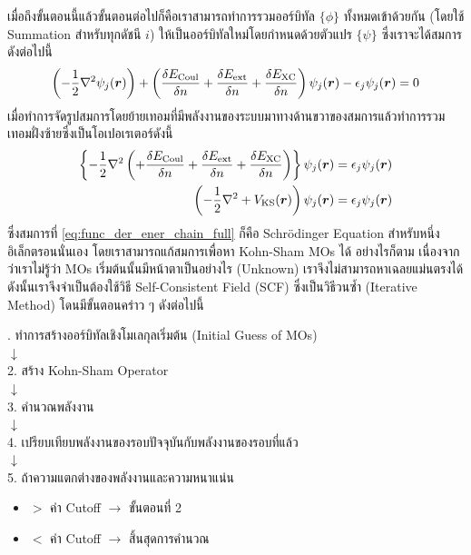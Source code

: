 %
เมื่อถึงขั้นตอนนี้แล้วขั้นตอนต่อไปก็คือเราสามารถทำการรวมออร์บิทัล $\{\phi\}$ ทั้งหมดเข้าด้วยกัน (โดยใช้ Summation สำหรับทุกดัชนี $i$) ให้เป็นออร์บิทัลใหม่โดยกำหนดด้วยตัวแปร $\{\psi\}$ ซึ่งเราจะได้สมการดังต่อไปนี้
%
\begin{equation}
    \left ( -\frac{1}{2}\nabla^{2} \psi_{j}(\bm{r}) \right )
    + \left ( \fdv{E_{\text{Coul}}}{n} + \fdv{E_{\text{ext}}}{n} + \fdv{E_{\text{XC}}}{n} \right )
    \psi_{j}(\bm{r}) - \epsilon_{j} \psi_{j}(\bm{r})
    = 0
\end{equation}
%
\noindent เมื่อทำการจัดรูปสมการโดยย้ายเทอมที่มีพลังงานของระบบมาทางด้านขวาของสมการแล้วทำการรวมเทอมฝั่งซ้ายซึ่งเป็นโอเปอเรเตอร์ดังนี้
%
\begin{align}
    \left \{ -\frac{1}{2}\nabla^{2} \left (
    + \fdv{E_{\text{Coul}}}{n} + \fdv{E_{\text{ext}}}{n} + \fdv{E_{\text{XC}}}{n} \right )
    \right \} \psi_{j}(\bm{r})
    = \epsilon_{j} \psi_{j}(\bm{r}) \nonumber \\
    \left ( -\frac{1}{2}\nabla^{2} + V_{\text{KS}}(\bm{r}) \right ) \psi_{j}(\bm{r})
    = \epsilon_{j} \psi_{j}(\bm{r}) \label{eq:func_der_ener_chain_full}
\end{align}
%
\noindent ซึ่งสมการที่ \eqref{eq:func_der_ener_chain_full} ก็คือ Schr\"{o}dinger Equation สำหรับหนึ่งอิเล็กตรอนนั่นเอง โดยเราสามารถแก้สมการเพื่อหา Kohn-Sham MOs ได้ อย่างไรก็ตาม เนื่องจากว่าเราไม่รู้ว่า MOs เริ่มต้นนั้นมีหน้าตาเป็นอย่างไร (Unknown) เราจึงไม่สามารถหาเฉลยแม่นตรงได้ ดังนั้นเราจึงจำเป็นต้องใช้วิธี Self-Consistent Field (SCF) ซึ่งเป็นวิธีวนซ้ำ (Iterative Method) โดนมีขั้นตอนคร่าว ๆ ดังต่อไปนี้
%
\begin{framed}
    . ทำการสร้างออร์บิทัลเชิงโมเลกุลเริ่มต้น (Initial Guess of MOs)
    \\ $\downarrow$ \\
    2. สร้าง Kohn-Sham Operator
    \\ $\downarrow$ \\
    3. คำนวณพลังงาน
    \\ $\downarrow$ \\
    4. เปรียบเทียบพลังงานของรอบปัจจุบันกับพลังงานของรอบที่แล้ว
    \\ $\downarrow$ \\
    5. ถ้าความแตกต่างของพลังงานและความหนาแน่น
    \\
    \vspace{0.5em}
    \begin{minipage}{0.6\linewidth}
        \begin{itemize}
            \item $>$ ค่า Cutoff $\rightarrow$ ขั้นตอนที่ 2
            \item $<$ ค่า Cutoff $\rightarrow$ สิ้นสุดการคำนวณ
        \end{itemize}
    \end{minipage}
\end{framed}


